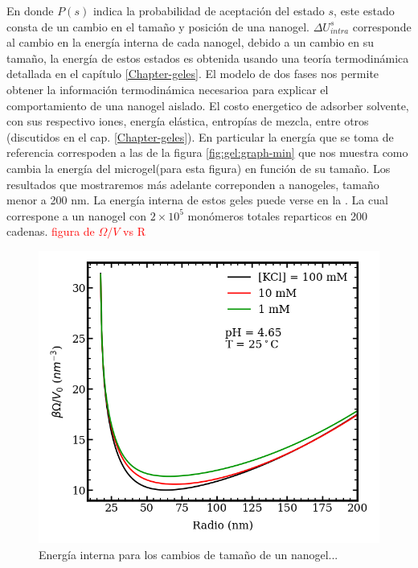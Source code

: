 En donde $P(s)$ indica la probabilidad de aceptaci\'on del estado $s$, este estado consta de un cambio en el tama\~no y posici\'on de una nanogel. $\Delta U^s_{intra}$ corresponde al cambio en la energ\'ia interna de cada nanogel, debido a un cambio en su tama\~no, la energ\'ia de estos estados es obtenida usando una teor\'ia termodin\'amica detallada en el cap\'itulo  \ref{Chapter-geles}. El modelo de dos fases nos permite obtener la informaci\'on termodin\'amica necesarioa para explicar el comportamiento de una nanogel aislado.
El costo energetico de adsorber solvente, con sus respectivo iones, energ\'ia el\'astica, entrop\'ias de mezcla, entre otros (discutidos en el cap. \ref{Chapter-geles}).
En particular la energ\'ia que se toma de referencia correspoden a las de la figura \ref{fig:gel:graph-min} que nos muestra como cambia la energ\'ia del microgel(para esta figura) en funci\'on de su tama\~no.
Los resultados que mostraremos m\'as adelante correponden a nanogeles, tama\~no menor a 200 nm.
La energ\'ia interna de estos geles puede verse en la . La cual correspone a un nanogel con $2\times10^5$ mon\'omeros totales reparticos en 200 cadenas. \textcolor{red}{figura de $\Omega/V$ vs R}

\begin{figure}[!tb]
	\centering
	\includegraphics[width=1\linewidth]{Figures/graph-mc/interna.png}
	\caption{Energ\'ia interna para los cambios de tamaño de un nanogel...}
	\label{fig:mc:omega}
\end{figure}


